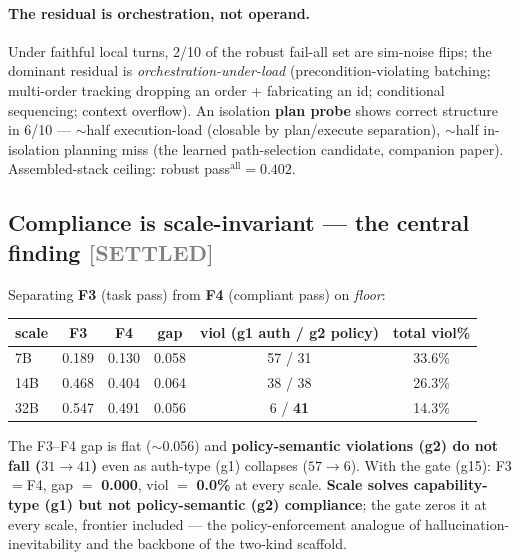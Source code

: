 \documentclass[10pt]{article}
\newcommand{\settled}{\textcolor{gray}{\small[SETTLED]}}
\begin{document}
\paragraph{The residual is orchestration, not operand.}\label{sec:plan} Under faithful local turns, 2/10 of the robust fail-all set are sim-noise flips; the dominant residual is \emph{orchestration-under-load} (precondition-violating batching; multi-order tracking dropping an order + fabricating an id; conditional sequencing; context overflow). An isolation \textbf{plan probe} shows correct structure in 6/10 --- $\sim$half execution-load (closable by plan/execute separation), $\sim$half in-isolation planning miss (the learned path-selection candidate, companion paper). Assembled-stack ceiling: robust pass$^{\mathrm{all}}=0.402$.

\subsection{Compliance is scale-invariant --- the central finding \settled}\label{sec:compliance}
Separating \textbf{F3} (task pass) from \textbf{F4} (compliant pass) on \emph{floor}:
\begin{center}\small\begin{tabular}{lccccc}
\toprule scale & F3 & F4 & gap & viol (g1 auth / g2 policy) & total viol\% \\ \midrule
7B  & 0.189 & 0.130 & 0.058 & 57 / 31 & 33.6\% \\
14B & 0.468 & 0.404 & 0.064 & 38 / 38 & 26.3\% \\
32B & 0.547 & 0.491 & 0.056 & 6 / \textbf{41} & 14.3\% \\ \bottomrule
\end{tabular}\end{center}
The F3--F4 gap is flat ($\sim$0.056) and \textbf{policy-semantic violations (g2) do not fall ($31\to41$)} even as auth-type (g1) collapses ($57\to6$). With the gate (g15): F3${=}$F4, gap ${=}$ \textbf{0.000}, viol ${=}$ \textbf{0.0\%} at every scale. \textbf{Scale solves capability-type (g1) but not policy-semantic (g2) compliance}; the gate zeros it at every scale, frontier included --- the policy-enforcement analogue of hallucination-inevitability and the backbone of the two-kind scaffold.
\end{document}
